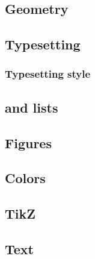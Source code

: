     \subsection{Geometry}
    \label{sec:tutorial/preamble/geometry}
    
    
    \subsection{Typesetting}
    \label{sec:tutorial/preamble/listing}
    
    
        \subsubsection{Typesetting style}
        \label{sec:tutorial/preamble/listing/style}
        
    
    \subsection*{\thesubsection\hspace{1em} and lists}
    \label{sec:tutorial/preamble/toc}
    
    
    \subsection{Figures}
    \label{sec:tutorial/preamble/fig}
    
    
    \subsection{Colors}
    \label{sec:tutorial/preamble/color}
    
    
    \subsection{TikZ}
    \label{sec:tutorial/preamble/tikz}
    
    
    \subsection{Text}
    \label{sec:tutorial/preamble/text}
    
    
